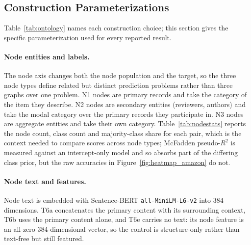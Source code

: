 %
%

\subsection{Construction Parameterizations}
\label{app:params}

Table~\ref{tab:ontology} names each construction choice; this section gives the
specific parameterization used for every reported result.

\paragraph{Node entities and labels.}
The node axis changes both the node population and the target, so the three
node types define related but distinct prediction problems rather than three
graphs over one problem.
N1 nodes are primary records and take the category of the item they describe.
N2 nodes are secondary entities (reviewers, authors) and take the modal
category over the primary records they participate in. N3 nodes are aggregate
entities and take their own category. Table~\ref{tab:nodestats} reports the
node count, class count and majority-class share for each pair, which is the
context needed to compare scores across node types; McFadden pseudo-$R^2$ is
measured against an intercept-only model and so absorbs part of the differing
class prior, but the raw accuracies in Figure~\ref{fig:heatmap_amazon} do not.

\paragraph{Node text and features.}
Node text is embedded with Sentence-BERT \texttt{all-MiniLM-L6-v2} into 384
dimensions. T6a concatenates the primary content with its surrounding context,
T6b uses the primary content alone, and T6e carries no text: its node feature
is an all-zero 384-dimensional vector, so the control is structure-only rather
than text-free but still featured.

